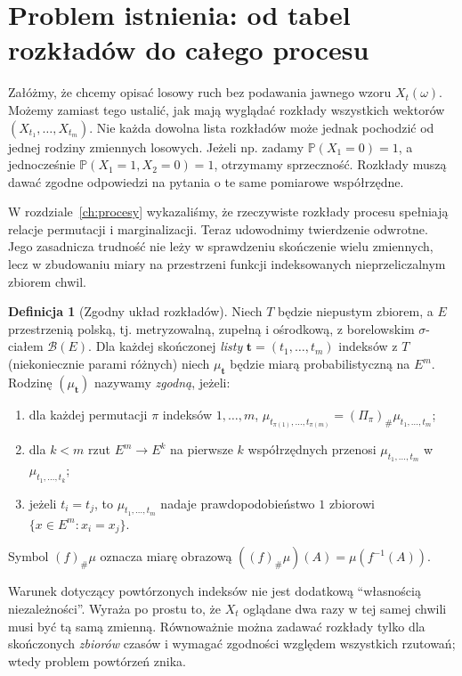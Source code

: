 \documentclass[11pt,a4paper,oneside]{report}
\numberwithin{equation}{chapter}
\theoremstyle{plain}
\theoremstyle{definition}
\newtheorem{definicja}{Definicja}[chapter]
\theoremstyle{remark}
\newcommand{\Prob}{\mathbb{P}}
\newcommand{\calB}{\mathcal{B}}
\begin{document}
\section{Problem istnienia: od tabel rozkładów do całego procesu}
Załóżmy, że chcemy opisać losowy ruch bez podawania jawnego wzoru
$X_t(\omega)$. Możemy zamiast tego ustalić, jak mają wyglądać
rozkłady wszystkich wektorów
$(X_{t_1},\ldots,X_{t_m})$. Nie każda dowolna lista rozkładów
może jednak pochodzić od jednej rodziny zmiennych losowych.
Jeżeli np. zadamy $\Prob(X_1=0)=1$, a jednocześnie
$\Prob(X_1=1,X_2=0)=1$, otrzymamy sprzeczność.
Rozkłady muszą dawać zgodne odpowiedzi na pytania o te same
pomiarowe współrzędne.

W rozdziale~\ref{ch:procesy} wykazaliśmy, że rzeczywiste
rozkłady procesu spełniają relacje permutacji i marginalizacji.
Teraz udowodnimy twierdzenie odwrotne. Jego zasadnicza trudność
nie leży w sprawdzeniu skończenie wielu zmiennych, lecz w
zbudowaniu miary na przestrzeni funkcji indeksowanych
nieprzeliczalnym zbiorem chwil.

\begin{definicja}[Zgodny układ rozkładów]
Niech $T$ będzie niepustym zbiorem, a $E$ przestrzenią polską,
tj. metryzowalną, zupełną i ośrodkową, z borelowskim
$\sigma$-ciałem $\calB(E)$. Dla każdej skończonej
\emph{listy} $\mathbf t=(t_1,\ldots,t_m)$ indeksów z $T$
(niekoniecznie parami różnych) niech $\mu_{\mathbf t}$
będzie miarą probabilistyczną na $E^m$.
Rodzinę $(\mu_{\mathbf t})$ nazywamy \emph{zgodną}, jeżeli:
\begin{enumerate}
\item dla każdej permutacji $\pi$ indeksów $1,\ldots,m$,
$\mu_{t_{\pi(1)},\ldots,t_{\pi(m)}}=(\Pi_\pi)_\#\mu_{t_1,\ldots,t_m}$;
\item dla $k<m$ rzut $E^m\to E^k$ na pierwsze $k$ współrzędnych
przenosi $\mu_{t_1,\ldots,t_m}$ w $\mu_{t_1,\ldots,t_k}$;
\item jeżeli $t_i=t_j$, to $\mu_{t_1,\ldots,t_m}$ nadaje
prawdopodobieństwo $1$ zbiorowi $\{x\in E^m:x_i=x_j\}$.
\end{enumerate}
Symbol $(f)_\#\mu$ oznacza miarę obrazową
$((f)_\#\mu)(A)=\mu(f^{-1}(A))$.
\end{definicja}

Warunek dotyczący powtórzonych indeksów nie jest dodatkową
``własnością niezależności''. Wyraża po prostu to, że
$X_t$ oglądane dwa razy w tej samej chwili musi być tą samą
zmienną. Równoważnie można zadawać rozkłady tylko dla
skończonych \emph{zbiorów} czasów i wymagać zgodności
względem wszystkich rzutowań; wtedy problem powtórzeń znika.
\end{document}
